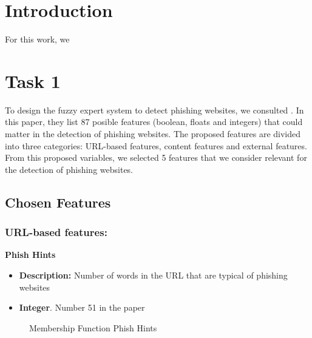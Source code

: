 \documentclass[11pt]{article}
\begin{document}
\tableofcontents
\newpage

\section{Introduction}
For this work, we 

\section{Task 1}
To design the fuzzy expert system to detect phishing websites, we consulted \cite{main_paper}. In this paper, they list 87 posible features (boolean, floats and integers) that could matter in the detection of phishing websites. The proposed features are divided into three categories: URL-based features, content features and external features. From this proposed variables, we selected 5 features that we consider relevant for the detection of phishing websites.

\subsection{Chosen Features}


\subsubsection{URL-based features:}
\textbf{Phish Hints} 
\begin{itemize}
    \item \textbf{Description:} Number of words in the URL that are typical of phishing websites
    \item \textbf{Integer}. Number 51 in the paper
\end{itemize}

\begin{figure}[H]
    \centering
    \caption{Membership Function Phish Hints}
\end{figure}
\end{document}
